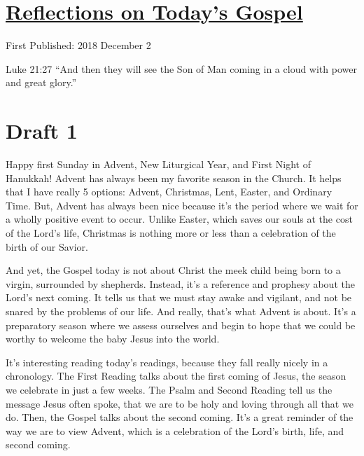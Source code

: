 \documentclass[12pt]{article}[titlepage]
\newcommand{\say}[1]{``#1''}
\newcommand{\1}{\={a}}
\newcommand{\2}{\={e}}
\newcommand{\3}{\={\i}}
\newcommand{\4}{\=o}
\newcommand{\5}{\=u}
\newcommand{\6}{\={A}}
\renewcommand{\,}{\textsuperscript{,}}
\begin{document}
\doublespacing
\section{\href{reflections-on-readings-1-advent-c.html}{Reflections on Today's Gospel}}
First Published: 2018 December 2

Luke 21:27 \say{And then they will see the Son of Man coming in a cloud with power and great glory.}

\section{Draft 1}
Happy first Sunday in Advent, New Liturgical Year, and First Night of Hanukkah!
Advent has always been my favorite season in the Church.
It helps that I have really 5 options: Advent, Christmas, Lent, Easter, and Ordinary Time.
But, Advent has always been nice because it's the period where we wait for a wholly positive event to occur.
Unlike Easter, which saves our souls at the cost of the Lord's life, Christmas is nothing more or less than a celebration of the birth of our Savior.

And yet, the Gospel today is not about Christ the meek child being born to a virgin, surrounded by shepherds.
Instead, it's a reference and prophesy about the Lord's next coming.
It tells us that we must stay awake and vigilant, and not be snared by the problems of our life.
And really, that's what Advent is about.
It's a preparatory season where we assess ourselves and begin to hope that we could be worthy to welcome the baby Jesus into the world.

It's interesting reading today's readings, because they fall really nicely in a chronology.
The First Reading talks about the first coming of Jesus, the season we celebrate in just a few weeks.
The Psalm and Second Reading tell us the message Jesus often spoke, that we are to be holy and loving through all that we do.
Then, the Gospel talks about the second coming.
It's a great reminder of the way we are to view Advent, which is a celebration of the Lord's birth, life, and second coming.
\end{document}
